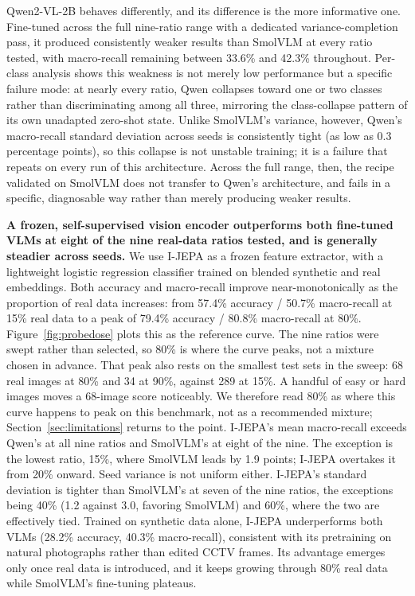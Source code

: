 \documentclass[conference]{IEEEtran}
\begin{document}
Qwen2-VL-2B behaves differently, and its difference is the more informative one. Fine-tuned across the full nine-ratio range with a dedicated variance-completion pass, it produced consistently weaker results than SmolVLM at every ratio tested, with macro-recall remaining between 33.6\% and 42.3\% throughout. Per-class analysis shows this weakness is not merely low performance but a specific failure mode: at nearly every ratio, Qwen collapses toward one or two classes rather than discriminating among all three, mirroring the class-collapse pattern of its own unadapted zero-shot state. Unlike SmolVLM's variance, however, Qwen's macro-recall standard deviation across seeds is consistently tight (as low as 0.3 percentage points), so this collapse is not unstable training; it is a failure that repeats on every run of this architecture. Across the full range, then, the recipe validated on SmolVLM does not transfer to Qwen's architecture, and fails in a specific, diagnosable way rather than merely producing weaker results.

\textbf{A frozen, self-supervised vision encoder outperforms both fine-tuned VLMs at eight of the nine real-data ratios tested, and is generally steadier across seeds.} We use I-JEPA as a frozen feature extractor, with a lightweight logistic regression classifier trained on blended synthetic and real embeddings. Both accuracy and macro-recall improve near-monotonically as the proportion of real data increases: from 57.4\% accuracy / 50.7\% macro-recall at 15\% real data to a peak of 79.4\% accuracy / 80.8\% macro-recall at 80\%. Figure~\ref{fig:probedose} plots this as the reference curve. The nine ratios were swept rather than selected, so 80\% is where the curve peaks, not a mixture chosen in advance. That peak also rests on the smallest test sets in the sweep: 68 real images at 80\% and 34 at 90\%, against 289 at 15\%. A handful of easy or hard images moves a 68-image score noticeably. We therefore read 80\% as where this curve happens to peak on this benchmark, not as a recommended mixture; Section~\ref{sec:limitations} returns to the point. I-JEPA's mean macro-recall exceeds Qwen's at all nine ratios and SmolVLM's at eight of the nine. The exception is the lowest ratio, 15\%, where SmolVLM leads by 1.9 points; I-JEPA overtakes it from 20\% onward. Seed variance is not uniform either. I-JEPA's standard deviation is tighter than SmolVLM's at seven of the nine ratios, the exceptions being 40\% (1.2 against 3.0, favoring SmolVLM) and 60\%, where the two are effectively tied. Trained on synthetic data alone, I-JEPA underperforms both VLMs (28.2\% accuracy, 40.3\% macro-recall), consistent with its pretraining on natural photographs rather than edited CCTV frames. Its advantage emerges only once real data is introduced, and it keeps growing through 80\% real data while SmolVLM's fine-tuning plateaus.
\end{document}
